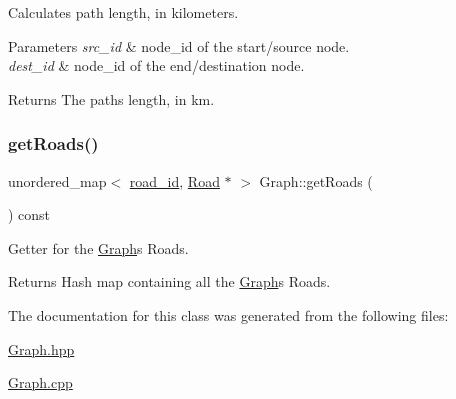 Calculates path length, in kilometers.


\begin{DoxyParams}{Parameters}
{\em src\+\_\+id} & node\+\_\+id of the start/source node. \\
\hline
{\em dest\+\_\+id} & node\+\_\+id of the end/destination node.\\
\hline
\end{DoxyParams}
\begin{DoxyReturn}{Returns}
The path\textquotesingle{}s length, in km. 
\end{DoxyReturn}
\hypertarget{class_graph_a101befc9baedb7dc3aaa714c968dc943}{}\label{class_graph_a101befc9baedb7dc3aaa714c968dc943} 
\subsubsection{\texorpdfstring{get\+Roads()}{getRoads()}}
{\footnotesize\ttfamily unordered\+\_\+map$<$ \hyperlink{_road_8hpp_a8e0db0d135782948da5d293720dbfb46}{road\+\_\+id}, \hyperlink{class_road}{Road} $\ast$ $>$ Graph\+::get\+Roads (\begin{DoxyParamCaption}{ }\end{DoxyParamCaption}) const}

Getter for the \hyperlink{class_graph}{Graph}\textquotesingle{}s Roads.

\begin{DoxyReturn}{Returns}
Hash map containing all the \hyperlink{class_graph}{Graph}\textquotesingle{}s Roads. 
\end{DoxyReturn}


The documentation for this class was generated from the following files\+:\begin{DoxyCompactItemize}
\item 
\hyperlink{_graph_8hpp}{Graph.\+hpp}\item 
\hyperlink{_graph_8cpp}{Graph.\+cpp}\end{DoxyCompactItemize}
